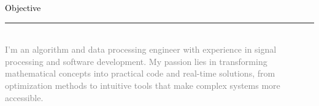 
{\setmainfont{Rubik Medium}\fontsize{11}{14}\selectfont\textcolor{black}{Objective}}\\[-4pt]
\textcolor{black}{\rule{\textwidth}{2pt}}\\[6pt]
{\setmainfont{Rubik Light}\fontsize{10}{13}\selectfont
\textcolor{gray}{
I'm an algorithm and data processing engineer with experience in signal processing and software development. 
My passion lies in transforming mathematical concepts into practical code and real-time solutions, 
from optimization methods to intuitive tools that make complex systems more accessible.
}} 
